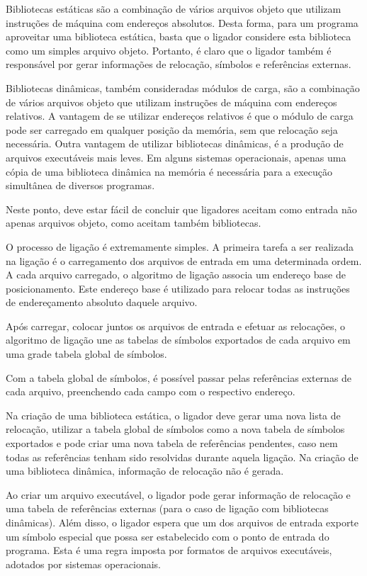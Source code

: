 Bibliotecas estáticas são a combinação de vários arquivos objeto que utilizam
instruções de máquina com endereços absolutos. Desta forma, para um programa
aproveitar uma biblioteca estática, basta que o ligador considere esta
biblioteca como um simples arquivo objeto. Portanto, é claro que o ligador
também é responsável por gerar informações de relocação, símbolos e referências
externas.

Bibliotecas dinâmicas, também consideradas módulos de carga, são a combinação de
vários arquivos objeto que utilizam instruções de máquina com endereços
relativos. A vantagem de se utilizar endereços relativos é que o módulo de carga
pode ser carregado em qualquer posição da memória, sem que relocação seja
necessária. Outra vantagem de utilizar bibliotecas dinâmicas, é a produção de
arquivos executáveis mais leves. Em alguns sistemas operacionais, apenas uma
cópia de uma biblioteca dinâmica na memória é necessária para a execução
simultânea de diversos programas.

Neste ponto, deve estar fácil de concluir que ligadores aceitam como entrada não
apenas arquivos objeto, como aceitam também bibliotecas.

O processo de ligação é extremamente simples. A primeira tarefa a ser realizada
na ligação é o carregamento dos arquivos de entrada em uma determinada ordem. A
cada arquivo carregado, o algoritmo de ligação associa um endereço base de
posicionamento. Este endereço base é utilizado para relocar todas as instruções
de endereçamento absoluto daquele arquivo.

Após carregar, colocar juntos os arquivos de entrada e efetuar as relocações, o
algoritmo de ligação une as tabelas de símbolos exportados de cada arquivo em
uma grade tabela global de símbolos.

Com a tabela global de símbolos, é possível passar pelas referências externas de
cada arquivo, preenchendo cada campo com o respectivo endereço.

Na criação de uma biblioteca estática, o ligador deve gerar uma nova lista de
relocação, utilizar a tabela global de símbolos como a nova tabela de símbolos
exportados e pode criar uma nova tabela de referências pendentes, caso nem todas
as referências tenham sido resolvidas durante aquela ligação. Na criação de uma
biblioteca dinâmica, informação de relocação não é gerada.

Ao criar um arquivo executável, o ligador pode gerar informação de relocação e
uma tabela de referências externas (para o caso de ligação com bibliotecas
dinâmicas). Além disso, o ligador espera que um dos arquivos de entrada exporte
um símbolo especial que possa ser estabelecido com o ponto de entrada do
programa. Esta é uma regra imposta por formatos de arquivos executáveis,
adotados por sistemas operacionais.

